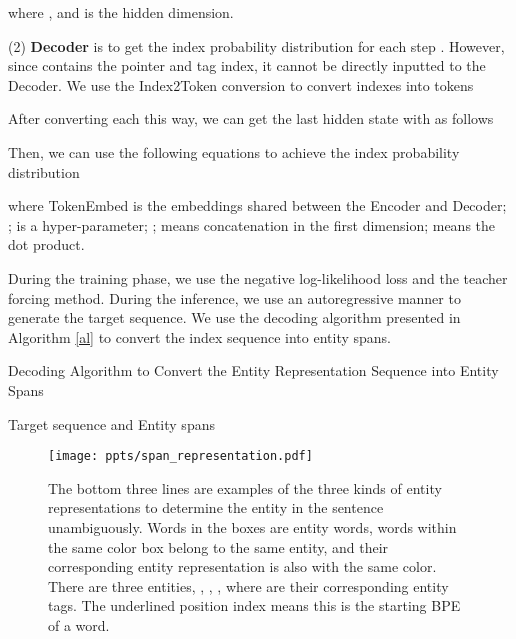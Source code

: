 \documentclass[11pt,a4paper]{article}
\begin{document}
where , and  is the hidden dimension.

(2) \textbf{Decoder} is to get the index probability distribution for each step . However, since  contains the pointer and tag index, it cannot be directly inputted to the Decoder. We use the Index2Token conversion to convert indexes into tokens


After converting each  this way, we can get the last hidden state  with  as follows

Then, we can use the following equations to achieve the index probability distribution 

where TokenEmbed is the embeddings shared between the Encoder and Decoder; ;  is a hyper-parameter; ;  means concatenation in the first dimension;  means the dot product.




During the training phase, we use the negative log-likelihood loss and the teacher forcing method. During the inference, we use an autoregressive manner to generate the target sequence. We use the decoding algorithm presented in Algorithm \ref{al} to convert the index sequence into entity spans.


\begin{algorithm}[!bht]
  \begin{algorithmic}[1]
    \caption{Decoding Algorithm to Convert the Entity Representation Sequence into Entity Spans} \label{al}
    \Require Target sequence  and 
    \Ensure  Entity spans 
    \State 
    \While{}
      \State 
      \If{}
        \If{}
          \State 
        \EndIf
        \State 
      \Else
      \State 
      \EndIf
      \State 
    \EndWhile
    \State \Return 
  \end{algorithmic}
\end{algorithm}


\begin{figure}[!bht]
\centering
  \texttt{[image: ppts/span\_representation.pdf]}
  \caption{The bottom three lines are examples of the three kinds of entity representations to determine the entity in the sentence unambiguously. Words in the boxes are entity words, words within the same color box belong to the same entity, and their corresponding entity representation is also with the same color. There are three entities, , , , where  are their corresponding entity tags. The underlined position index means this is the starting BPE of a word.}\label{fig:span_representation}
\end{figure}
\end{document}
